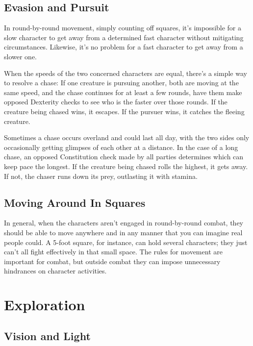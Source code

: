 \subsection{Evasion and Pursuit}

In round-by-round movement, simply counting off squares, it's impossible for a slow character to get away from a determined fast character without mitigating circumstances. Likewise, it's no problem for a fast character to get away from a slower one. 

When the speeds of the two concerned characters are equal, there's a simple way to resolve a chase: If one creature is pursuing another, both are moving at the same speed, and the chase continues for at least a few rounds, have them make opposed Dexterity checks to see who is the faster over those rounds. If the creature being chased wins, it escapes. If the pursuer wins, it catches the fleeing creature. 

Sometimes a chase occurs overland and could last all day, with the two sides only occasionally getting glimpses of each other at a distance. In the case of a long chase, an opposed Constitution check made by all parties determines which can keep pace the longest. If the creature being chased rolls the highest, it gets away. If not, the chaser runs down its prey, outlasting it with stamina.

\subsection{Moving Around In Squares}

In general, when the characters aren't engaged in round-by-round combat, they should be able to move anywhere and in any manner that you can imagine real people could. A 5-foot square, for instance, can hold several characters; they just can't all fight effectively in that small space. The rules for movement are important for combat, but outside combat they can impose unnecessary hindrances on character activities.

\section{Exploration}

\subsection{Vision and Light}

